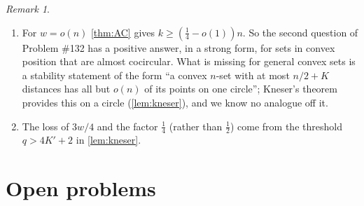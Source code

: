 \documentclass[11pt]{amsart}
\theoremstyle{definition}
\theoremstyle{remark}
\newtheorem{remark}[theorem]{Remark}
\begin{document}
\begin{remark}\label{rem:AC}
\begin{enumerate}[leftmargin=2em,label=(\alph*)]
\item For $w=o(n)$ \cref{thm:AC} gives $k\ge(\frac14-o(1))n$. So the second question of Problem \#132 has a positive answer, in a strong form, for sets in convex position that are almost cocircular. What is missing for general convex sets is a stability statement of the form ``a convex $n$-set with at most $n/2+K$ distances has all but $o(n)$ of its points on one circle''; Kneser's theorem provides this on a circle (\cref{lem:kneser}), and we know no analogue off it.
\item The loss of $3w/4$ and the factor $\frac14$ (rather than $\frac12$) come from the threshold $q>4K'+2$ in \cref{lem:kneser}.
\end{enumerate}
\end{remark}

\section{Open problems}\label{sec:open}
\end{document}
